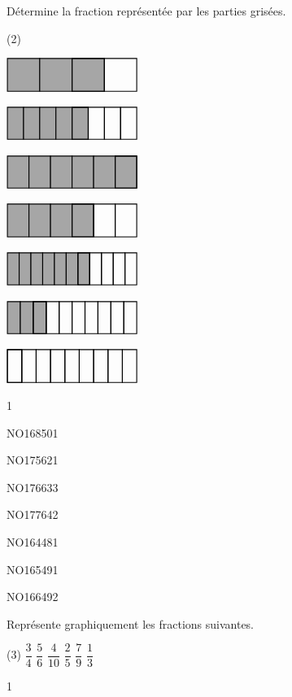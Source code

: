 \documentclass[a4paper,11pt]{report}
\begin{document}
\begin{exop}{
	Détermine la fraction représentée par les parties grisées.
	\begin{tasks}(2)
		\task 
			
			$\fracrect[xscale=4]{3}{4}$

			\hrulefill

		\task 
			
			$\fracrect[xscale=4]{5}{8}$

\hrulefill

		\task 
			
			$\fracrect[xscale=4]{6}{6}$	
			\vspace{2pt}

		\hspace{24pt}$\fracrect[xscale=4]{4}{6}$

\hrulefill

		\task 
			
			$\fracrect[xscale=4]{7}{11}$

\hrulefill

		\task 
			
			$\fracrect[xscale=4]{3}{10}$

\hrulefill

		\task 
			
			$\emptyfracrect[xscale=4]{9}$

\hrulefill

\vspace{1cm}
\phantom{test}

	\end{tasks}
}{1}\end{exop}


\begin{exol}{NO168}{50}{1}
\end{exol}
\begin{exof}{NO175}{62}{1}
\end{exof}
\begin{exof}{NO176}{63}{3}
\end{exof}
\vfill
\begin{exof}{NO177}{64}{2}
\end{exof}
\vfill
\begin{exol}{NO164}{48}{1}
\end{exol}
\vfill
\begin{exol}{NO165}{49}{1}
\end{exol}
\vfill
\begin{exol}{NO166}{49}{2}
\end{exol}

\vfill
\begin{exo}{
Représente graphiquement les fractions suivantes.
	\begin{tasks}(3)
		\task $\dfrac{3}{4}$
		\task $\dfrac{5}{6}$
		\task $\dfrac{4}{10}$
		\task $\dfrac{2}{5}$
		\task $\dfrac{7}{9}$
		\task $\dfrac{1}{3}$
	\end{tasks}
 \vspace{1pt}
}{1}\end{exo}
\end{document}
